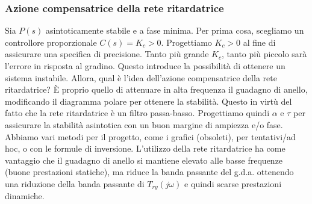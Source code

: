 \documentclass[11pt]{article}
\begin{document}
\subsubsection{Azione compensatrice della rete ritardatrice}
Sia $P(s)$ asintoticamente stabile e a fase minima. Per prima cosa, scegliamo un controllore proporzionale $C(s)=K_c>0$. Progettiamo $K_c>0$ al fine di assicurare una specifica di precisione. Tanto più grande $K_c$, tanto più piccolo sarà l'errore in risposta al gradino. Questo introduce la possibilità di ottenere un sistema instabile. Allora, qual è l'idea dell'azione compensatrice della rete ritardatrice? È proprio quello di attenuare in alta frequenza il guadagno di anello, modificando il diagramma polare per ottenere la stabilità. Questo in virtù del fatto che la rete ritardatrice è un filtro passa-basso. Progettiamo quindi $\alpha$ e $\tau$ per assicurare la stabilità asintotica con un buon margine di ampiezza e/o fase. Abbiamo vari metodi per il progetto, come i grafici (obsoleti), per tentativi/ad hoc, o con le formule di inversione. L'utilizzo della rete ritardatrice ha come vantaggio che il guadagno di anello si mantiene elevato alle basse frequenze (buone prestazioni statiche), ma riduce la banda passante del g.d.a. ottenendo una riduzione della banda passante di $T_{ry}(j\omega)$ e quindi scarse prestazioni dinamiche. 
\end{document}
